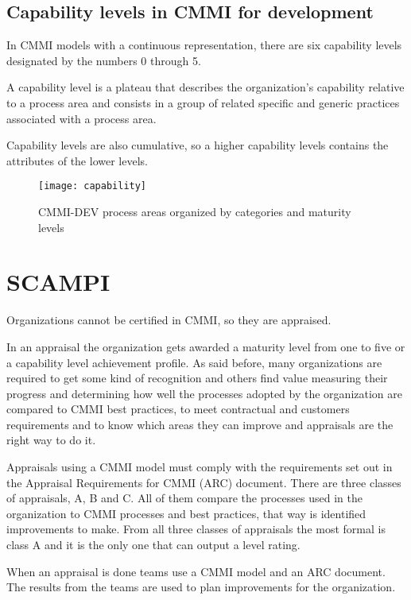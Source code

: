 \subsection{Capability levels in CMMI for development}

In CMMI models with a continuous representation, there are six capability levels designated by the numbers 0 through 5.

A capability level is a plateau that describes the organization's capability relative to a process area and consists in a group of related specific and generic practices associated with a process area.

Capability levels are also cumulative, so a higher capability levels contains the attributes of the lower levels.

\begin{figure}[h]
	\begin{center}
		\leavevmode
		\texttt{[image: capability]}
		\caption{CMMI-DEV process areas organized by categories and maturity levels}
		\label{fig:capabilitylevels}
	\end{center}
\end{figure}


\section{SCAMPI}
Organizations cannot be certified in CMMI, so they are appraised.

In an appraisal the organization gets awarded a maturity level from one to five or a capability level achievement profile. As said before, many organizations are required to get some kind of recognition and others find value measuring their progress and determining how well the processes adopted by the organization are compared to CMMI best practices, to meet contractual and customers requirements and to know which areas they can improve and appraisals are the right way to do it.

Appraisals using a CMMI model must comply with the requirements set out in the Appraisal Requirements for CMMI (ARC) document\citep{team2001appraisal}. There are three classes of appraisals, A, B and C. All of them compare the processes used in the organization to CMMI processes and best practices, that way is identified improvements to make. From all three classes of appraisals the most formal is class A and it is the only one that can output a level rating.

When an appraisal is done teams use a CMMI model and an ARC document. The results from the teams are used to plan improvements for the organization.

